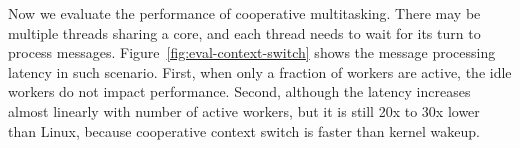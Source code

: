 Now we evaluate the performance of cooperative multitasking.
There may be multiple threads sharing a core, and each thread needs to wait for its turn to process messages.
Figure~\ref{fig:eval-context-switch} shows the message processing latency in such scenario.
First, when only a fraction of workers are active, the idle workers do not impact performance. 
Second, although the latency increases almost linearly with number of active workers, but it is still 20x to 30x lower than Linux, because cooperative context switch is faster than kernel wakeup.


